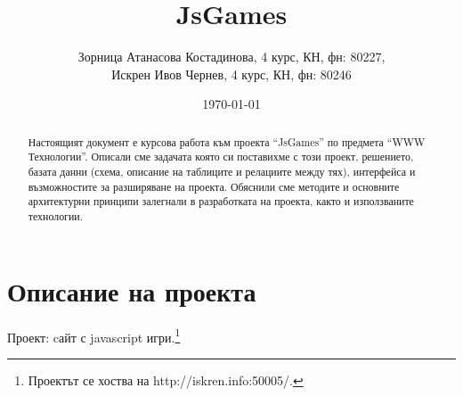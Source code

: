 \documentclass[a4paper]{article}
\def\jsg{JsGames}
\def\jsurl{http://iskren.info:50005/}
\begin{document}
\title{\jsg}
\author{
Зорница Атанасова Костадинова, 4 курс, КН, фн: 80227, \\
Искрен Ивов Чернев, 4 курс, КН, фн: 80246
}
\date{\today}
\maketitle


\begin{abstract}
Настоящият документ е курсова работа към проекта ``\jsg'' по предмета ``WWW
Технологии''. Описали сме задачата която си поставихме с този проект,
решението, базата данни (схема, описание на таблиците и релациите между тях),
интерфейса и възможностите за разширяване на проекта. Обяснили сме методите и
основните архитектурни принципи залегнали в разработката на проекта, както и
използваните технологии.
\end{abstract}
\newpage

\setcounter{tocdepth}{2}
\tableofcontents
\newpage

\section{Описание на проекта}

Проект: cайт с javascript игри.\footnote{Проектът се хоства на \jsurl.}
\end{document}
